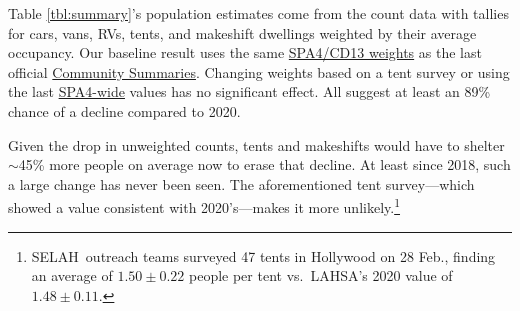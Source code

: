 \documentclass[11pt]{article}
\def\resp{respectively}
\def\selah{SELAH}
\def\nh{957\pm94}
\def\ne{556\pm83}
\begin{document}
 Table \ref{tbl:summary}'s population estimates  %
come from the count data with tallies for cars, vans, RVs, tents, and makeshift dwellings weighted by 
their average occupancy. Our baseline result uses the same %
\href{https://www.lahsa.org/documents?id=4635-usc-2018-2020-multipliers-and-estimates-overview}
{SPA4/CD13 weights} as the last official 
\href{https://www.lahsa.org/documents?id=4686-2020-greater-los-angeles-city-community-homelessness-report-service-planning-area-4.pdf}
{Community Summaries}. 
Changing weights based on a tent survey or using the last 
\href{https://www.lahsa.org/documents?id=4693-2020-greater-los-angeles-homeless-count-cvrtm-conversion-factors}{SPA4-wide} values has no significant effect.
All suggest at least an 89\% chance of a decline compared to 2020. 

Given the drop in unweighted counts, 
tents and makeshifts would have to shelter $\sim$45\% more 
people on average now to erase that decline. At least since 2018, such a large 
change has never been seen. The aforementioned tent survey---which showed a value 
consistent with 2020's---makes it more unlikely.\footnote{\selah\ outreach teams surveyed 47 tents in 
Hollywood on 28 Feb., finding an average of $1.50\pm0.22$ people per tent vs.~LAHSA's 2020 value 
of $1.48\pm0.11$.}
\end{document}
